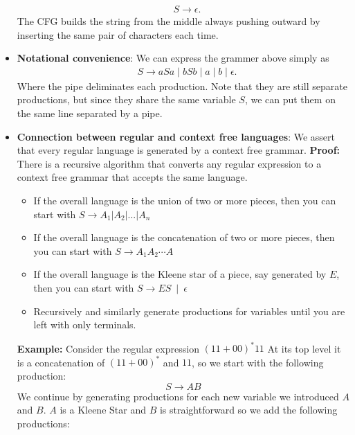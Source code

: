 \documentclass{report}
\begin{document}
\begin{itemize}
\begin{align*}
                &S \to \epsilon 
            .\end{align*}
            \bigbreak \noindent 
            The CFG builds the string from the middle always pushing outward by inserting the same pair of characters each time.
        \item \textbf{Notational convenience}: We can express the grammer above simply as
            \begin{align*}
                &S \to aSa \mid bSb \mid a \mid b \mid \epsilon
            .\end{align*}
            Where the pipe deliminates each production. Note that they are still separate productions, but since they share the same variable $S$, we can put them on the same line separated by a pipe.
        \item \textbf{Connection between regular and context free languages}: We assert that every regular language is generated by a context free grammar.
            \bigbreak \noindent 
            \textbf{Proof:} There is a recursive algorithm that converts any regular expression to a context free grammar that accepts the same language.
            \begin{itemize}
                \item If the overall language is the union of two or more pieces, then you can start with $S \to A_{1} | A_{2} | ... | A_{n}$
                \item If the overall language is the concatenation of two or more pieces, then you can start with $S \to A_{1}A_{2}\cdots A$
                \item If the overall language is the Kleene star of a piece, say generated by $E$, then you can start with $S \to ES \ \mid \ \epsilon$
                \item Recursively and similarly generate productions for variables until you are left with only terminals.
            \end{itemize}
            \bigbreak \noindent 
            \textbf{Example:} 
            Consider the regular expression \((11 + 00)^* 11\)
            \bigbreak \noindent 
            At its top level it is a concatenation of \((11 + 00)^*\) and \(11\), so we start with the following production:
            \[
                S \rightarrow AB
            \]
            We continue by generating productions for each new variable we introduced \(A\) and \(B\).
            \bigbreak \noindent 
            \(A\) is a Kleene Star and \(B\) is straightforward so we add the following productions:

\end{itemize}
\end{document}
